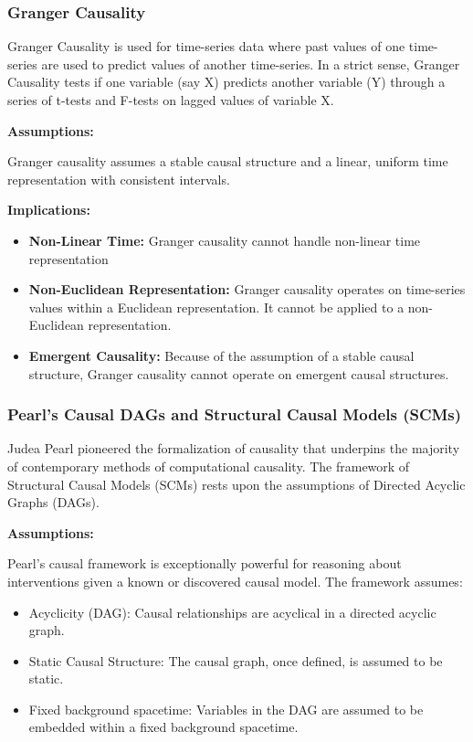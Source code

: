 \newpage

\subsubsection*{Granger Causality}

Granger Causality\cite{granger1969causal} is used for time-series data where past values of one time-series are used to predict values of another time-series. In a strict sense, Granger Causality tests if one variable (say X) predicts another variable (Y) through a series of t-tests and F-tests on lagged values of variable X.

\textbf{Assumptions:}

Granger causality assumes a stable causal structure and a linear, uniform time representation with consistent intervals.

\textbf{Implications:}

\begin{itemize}
    \item \textbf{Non-Linear Time:} Granger causality cannot handle non-linear time representation
    \item \textbf{Non-Euclidean Representation:} Granger causality operates on time-series values within a Euclidean representation. It cannot be applied to a non-Euclidean representation.
    \item \textbf{Emergent Causality:} Because of the assumption of a stable causal structure, Granger causality cannot operate on emergent causal structures.
\end{itemize}


\subsubsection*{Pearl's Causal DAGs and Structural Causal Models (SCMs)}

Judea Pearl pioneered the formalization of causality that underpins the majority of contemporary methods of computational causality. The framework of Structural Causal Models\cite{pearl2000causality} (SCMs) rests upon the assumptions of Directed Acyclic Graphs (DAGs).

\textbf{Assumptions:}

Pearl's causal framework is exceptionally powerful for reasoning about interventions given a known or discovered causal model.
The framework assumes: 

\begin{itemize}
    \item Acyclicity (DAG): Causal relationships are acyclical in a directed acyclic graph.
    \item Static Causal Structure: The causal graph, once defined, is assumed to be static.
    \item Fixed background spacetime: Variables in the DAG are assumed to be embedded within a fixed background spacetime.
\end{itemize}


